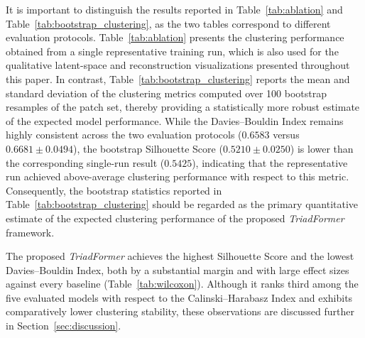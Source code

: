 \documentclass[pdflatex,sn-mathphys-num]{sn-jnl}
\begin{document}
It is important to distinguish the results reported in Table~\ref{tab:ablation} and Table~\ref{tab:bootstrap_clustering}, as the two tables correspond to different evaluation protocols. Table~\ref{tab:ablation} presents the clustering performance obtained from a single representative training run, which is also used for the qualitative latent-space and reconstruction visualizations presented throughout this paper. In contrast, Table~\ref{tab:bootstrap_clustering} reports the mean and standard deviation of the clustering metrics computed over 100 bootstrap resamples of the patch set, thereby providing a statistically more robust estimate of the expected model performance. While the Davies--Bouldin Index remains highly consistent across the two evaluation protocols ($0.6583$ versus $0.6681 \pm 0.0494$), the bootstrap Silhouette Score ($0.5210 \pm 0.0250$) is lower than the corresponding single-run result ($0.5425$), indicating that the representative run achieved above-average clustering performance with respect to this metric. Consequently, the bootstrap statistics reported in Table~\ref{tab:bootstrap_clustering} should be regarded as the primary quantitative estimate of the expected clustering performance of the proposed \textit{TriadFormer} framework.

The proposed \textit{TriadFormer} achieves the highest Silhouette Score and the lowest Davies--Bouldin Index, both by a substantial margin and with large effect sizes against every baseline (Table~\ref{tab:wilcoxon}). Although it ranks third among the five evaluated models with respect to the Calinski--Harabasz Index and exhibits comparatively lower clustering stability, these observations are discussed further in Section~\ref{sec:discussion}.
\end{document}
